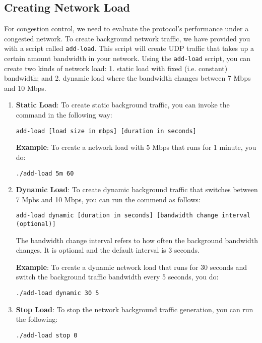 \documentclass[11pt]{article}
\begin{document}

\subsection{Creating Network Load}
For congestion control, we need to evaluate the protocol's performance under a congested network. To create background network traffic, we have provided you with a script called \texttt{add-load}. This script will create UDP traffic that takes up a certain amount bandwidth in your network. Using the \texttt{add-load} script, you can create two kinds of network load: 1. static load with fixed (i.e. constant) bandwidth; and 2. dynamic load where the bandwidth changes between 7 Mbps and 10 Mbps.

\begin{enumerate}
    \item \textbf{Static Load}: To create static background traffic, you can invoke the command in the following way:

    \texttt{add-load [load size in mbps] [duration in seconds]}

    \textbf{Example}: To create a network load with 5 Mbps that runs for 1 minute, you do:

    \texttt{./add-load 5m 60}

    \item \textbf{Dynamic Load}: To create dynamic background traffic that switches between 7 Mpbs and 10 Mbps, you can run the commend as follows:

    \texttt{add-load dynamic [duration in seconds] [bandwidth change interval (optional)]}

    The bandwidth change interval refers to how often the background bandwidth changes. It is optional and the default interval is 3 seconds.

    \textbf{Example}: To create a dynamic network load that runs for 30 seconds and switch the background traffic bandwidth every 5 seconds, you do:

    \texttt{./add-load dynamic 30 5}

    \item \textbf{Stop Load}: To stop the network background traffic generation, you can run the following:

    \texttt{./add-load stop 0}
\end{enumerate}
\end{document}
